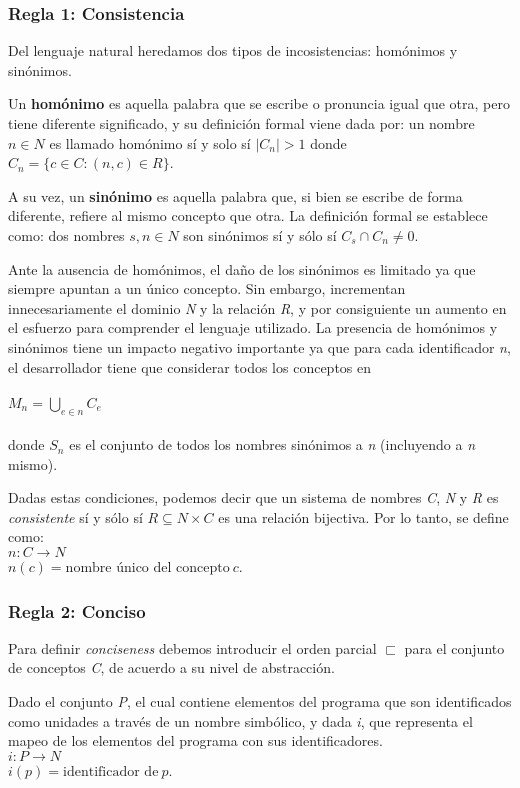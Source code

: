 \subsubsection{Regla 1: Consistencia}
Del lenguaje natural heredamos dos tipos de incosistencias: homónimos y sinónimos.

Un \textbf{homónimo} es aquella palabra que se escribe o pronuncia igual que otra, pero tiene diferente significado, y su definición formal viene dada por: un nombre $n \in N$ es llamado homónimo sí y solo sí $|C_n| > 1$ donde $C_n = \{ c \in C : (n,c) \in R\}$.

A su vez, un \textbf{sinónimo} es aquella palabra que, si bien se escribe de forma diferente, refiere al mismo concepto que otra. La definición formal se establece como: dos nombres $s,n \in N$ son sinónimos sí y sólo sí $C_s \cap C_n \neq 0$.

Ante la ausencia de homónimos, el daño de los sinónimos es limitado ya que siempre apuntan a un único concepto. Sin embargo, incrementan innecesariamente el dominio \textit{N} y la relación \textit{R}, y por consiguiente un aumento en el esfuerzo para comprender el lenguaje utilizado. La presencia de homónimos y sinónimos tiene un impacto negativo importante ya que para cada identificador \textit{n}, el desarrollador tiene que considerar todos los conceptos en
\\
\\$M_n = \bigcup_{e \in n} C_e$
\\
\\donde $S_n$ es el conjunto de todos los nombres sinónimos a \textit{n} (incluyendo a \textit{n} mismo).

Dadas estas condiciones, podemos decir que un sistema de nombres \textit{C}, \textit{N} y \textit{R} es \textit{consistente} sí y sólo sí $R \subseteq N \times C$ es una relación bijectiva. Por lo tanto, se define como:
\\$n : C \rightarrow N$
\\$n(c) = \mbox{nombre único del concepto} \ c$.

\subsubsection{Regla 2: Conciso}
Para definir \textit{conciseness} debemos introducir el orden parcial $\sqsubset$ para el conjunto de conceptos \textit{C}, de acuerdo a su nivel de abstracción.

Dado el conjunto \textit{P}, el cual contiene elementos del programa que son identificados como unidades a través de un nombre simbólico, y dada \textit{i}, que representa el mapeo de los elementos del programa con sus identificadores.
\\$i : P \rightarrow N$
\\$i(p) = \mbox{identificador de} \ p$.

